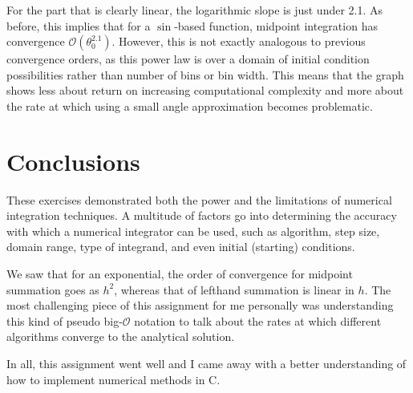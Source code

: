 \documentclass{article}
\begin{document}
For the part that is clearly linear, the logarithmic slope is just under 2.1. As before, this implies that for a $\sin$-based function, midpoint integration has convergence $\mathcal{O}(\theta_0^{2.1})$. However, this is not exactly analogous to previous convergence orders, as this power law is over a domain of initial condition possibilities rather than number of bins or bin width. This means that the graph shows less about return on increasing computational complexity and more about the rate at which using a small angle approximation becomes problematic.

\newpage

\section{Conclusions}

These exercises demonstrated both the power and the limitations of numerical integration techniques. A multitude of factors go into determining the accuracy with which a numerical integrator can be used, such as algorithm, step size, domain range, type of integrand, and even initial (starting) conditions.

We saw that for an exponential, the order of convergence for midpoint summation goes as $h^2$, whereas that of lefthand summation is linear in $h$. The most challenging piece of this assignment for me personally was understanding this kind of pseudo big-$\mathcal{O}$ notation to talk about the rates at which different algorithms converge to the analytical solution.

In all, this assignment went well and I came away with a better understanding of how to implement numerical methods in C.
\end{document}

